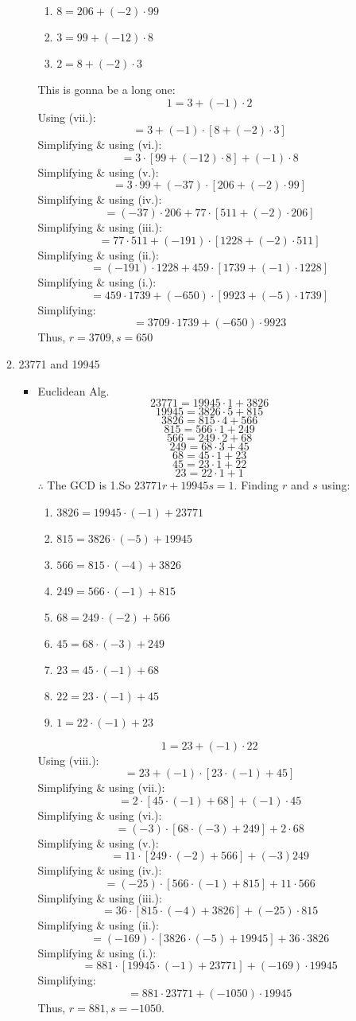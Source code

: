 \documentclass[12pt]{article}
\begin{document}
\begin{enumerate}
\begin{enumerate}
\begin{itemize}
\begin{enumerate}
                \item $8=206+(-2)\cdot99$
                \item $3=99+(-12)\cdot8$
                \item $2=8+(-2)\cdot3$
            \end{enumerate}
            This is gonna be a long one:$$1=3+(-1)\cdot2$$Using (vii.): $$=3+(-1)\cdot[8+(-2)\cdot3]$$ Simplifying \& using (vi.):$$=3\cdot[99+(-12)\cdot8]+(-1)\cdot8$$ Simplifying \& using (v.):$$=3\cdot99+(-37)\cdot[206+(-2)\cdot99]$$ Simplifying \& using (iv.):$$=(-37)\cdot206+77\cdot[511+(-2)\cdot206]$$Simplifying \& using (iii.):$$=77\cdot511+(-191)\cdot[1228+(-2)\cdot511]$$Simplifying \& using (ii.):$$=(-191)\cdot1228+459\cdot[1739+(-1)\cdot1228]$$Simplifying \& using (i.):$$=459\cdot1739+(-650)\cdot[9923+(-5)\cdot1739]$$Simplifying:$$=3709\cdot1739+(-650)\cdot9923$$ Thus, $r=3709, s=650$ 
            \end{itemize}
        \item 23771 and 19945
        \begin{itemize}
            \item Euclidean Alg. $$23771=19945\cdot1+3826$$ $$19945=3826\cdot5+815$$ $$3826=815\cdot4+566$$ $$815=566\cdot1+249$$ $$566=249\cdot2+68$$ $$249=68\cdot3+45$$ $$68=45\cdot1+23$$ $$45=23\cdot1+22$$ $$23=22\cdot1+1$$ $\therefore$ The GCD is 1.\newline So $23771r+19945s=1$. Finding $r$ and $s$ using: \begin{enumerate}
                \item $3826=19945\cdot(-1)+23771$
                \item $815=3826\cdot(-5)+19945$
                \item $566=815\cdot(-4)+3826$
                \item $249=566\cdot(-1)+815$
                \item $68=249\cdot(-2)+566$
                \item $45=68\cdot(-3)+249$
                \item $23=45\cdot(-1)+68$
                \item $22=23\cdot(-1)+45$
                \item $1=22\cdot(-1)+23$
            \end{enumerate}
            $$1=23+(-1)\cdot22$$Using (viii.): $$=23+(-1)\cdot[23\cdot(-1)+45]$$ Simplifying \& using (vii.):$$=2\cdot[45\cdot(-1)+68]+(-1)\cdot45$$ Simplifying \& using (vi.):$$=(-3)\cdot[68\cdot(-3)+249]+2\cdot68$$ Simplifying \& using (v.):$$=11\cdot[249\cdot(-2)+566]+(-3)249$$Simplifying \& using (iv.):$$=(-25)\cdot[566\cdot(-1)+815]+11\cdot566$$Simplifying \& using (iii.):$$=36\cdot[815\cdot(-4)+3826]+(-25)\cdot815$$Simplifying \& using (ii.):$$=(-169)\cdot[3826\cdot(-5)+19945]+36\cdot3826$$Simplifying \& using (i.):$$=881\cdot[19945\cdot(-1)+23771]+(-169)\cdot19945$$Simplifying:$$=881\cdot23771+(-1050)\cdot19945$$  Thus, $r=881, s=-1050$.

\end{itemize}
\end{enumerate}
\end{enumerate}
\end{document}
